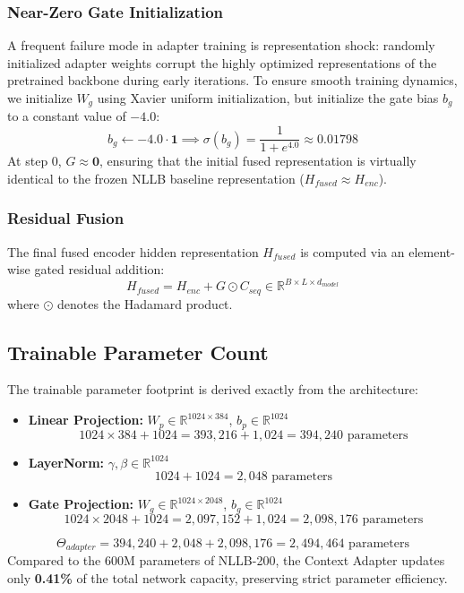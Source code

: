 \documentclass[conference]{IEEEtran}
\begin{document}
\subsubsection{Near-Zero Gate Initialization}
A frequent failure mode in adapter training is representation shock: randomly initialized adapter weights corrupt the highly optimized representations of the pretrained backbone during early iterations. To ensure smooth training dynamics, we initialize $W_g$ using Xavier uniform initialization, but initialize the gate bias $b_g$ to a constant value of $-4.0$:
\begin{equation}
b_g \leftarrow -4.0 \cdot \mathbf{1} \implies \sigma(b_g) = \frac{1}{1 + e^{4.0}} \approx 0.01798
\end{equation}
At step 0, $G \approx \mathbf{0}$, ensuring that the initial fused representation is virtually identical to the frozen NLLB baseline representation ($H_{fused} \approx H_{enc}$).

\subsubsection{Residual Fusion}
The final fused encoder hidden representation $H_{fused}$ is computed via an element-wise gated residual addition:
\begin{equation}
H_{fused} = H_{enc} + G \odot C_{seq} \in \mathbb{R}^{B \times L \times d_{model}}
\end{equation}
where $\odot$ denotes the Hadamard product.

\subsection{Trainable Parameter Count}
The trainable parameter footprint is derived exactly from the architecture:
\begin{itemize}
    \item \textbf{Linear Projection:} $W_p \in \mathbb{R}^{1024 \times 384}$, $b_p \in \mathbb{R}^{1024}$
    \begin{equation*}
    1024 \times 384 + 1024 = 393,216 + 1,024 = 394,240 \text{ parameters}
    \end{equation*}
    \item \textbf{LayerNorm:} $\gamma, \beta \in \mathbb{R}^{1024}$
    \begin{equation*}
    1024 + 1024 = 2,048 \text{ parameters}
    \end{equation*}
    \item \textbf{Gate Projection:} $W_g \in \mathbb{R}^{1024 \times 2048}$, $b_g \in \mathbb{R}^{1024}$
    \begin{equation*}
    1024 \times 2048 + 1024 = 2,097,152 + 1,024 = 2,098,176 \text{ parameters}
    \end{equation*}
\end{itemize}
\begin{equation}
\Theta_{adapter} = 394,240 + 2,048 + 2,098,176 = 2,494,464 \text{ parameters}
\end{equation}
Compared to the $600\text{M}$ parameters of NLLB-200, the Context Adapter updates only \textbf{0.41\%} of the total network capacity, preserving strict parameter efficiency.
\end{document}
